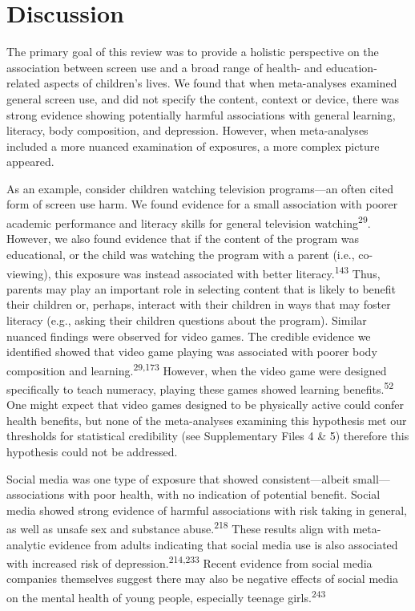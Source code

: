 \documentclass[
  english,
  man]{apa6}
\begin{document}
\hypertarget{discussion}{%
\section{Discussion}\label{discussion}}

The primary goal of this review was to provide a holistic perspective on the association between screen use and a broad range of health- and education-related aspects of children's lives.
We found that when meta-analyses examined general screen use, and did not specify the content, context or device, there was strong evidence showing potentially harmful associations with general learning, literacy, body composition, and depression.
However, when meta-analyses included a more nuanced examination of exposures, a more complex picture appeared.

As an example, consider children watching television programs---an often cited form of screen use harm.
We found evidence for a small association with poorer academic performance and literacy skills for general television watching\textsuperscript{29}.
However, we also found evidence that if the content of the program was educational, or the child was watching the program with a parent (i.e., co-viewing), this exposure was instead associated with better literacy.\textsuperscript{143}
Thus, parents may play an important role in selecting content that is likely to benefit their children or, perhaps, interact with their children in ways that may foster literacy (e.g., asking their children questions about the program).
Similar nuanced findings were observed for video games.
The credible evidence we identified showed that video game playing was associated with poorer body composition and learning.\textsuperscript{29,173}
However, when the video game were designed specifically to teach numeracy, playing these games showed learning benefits.\textsuperscript{52}
One might expect that video games designed to be physically active could confer health benefits, but none of the meta-analyses examining this hypothesis met our thresholds for statistical credibility (see Supplementary Files 4 \& 5) therefore this hypothesis could not be addressed.

Social media was one type of exposure that showed consistent---albeit small---associations with poor health, with no indication of potential benefit.
Social media showed strong evidence of harmful associations with risk taking in general, as well as unsafe sex and substance abuse.\textsuperscript{218}
These results align with meta-analytic evidence from adults indicating that social media use is also associated with increased risk of depression.\textsuperscript{214,233}
Recent evidence from social media companies themselves suggest there may also be negative effects of social media on the mental health of young people, especially teenage girls.\textsuperscript{243}
\end{document}
